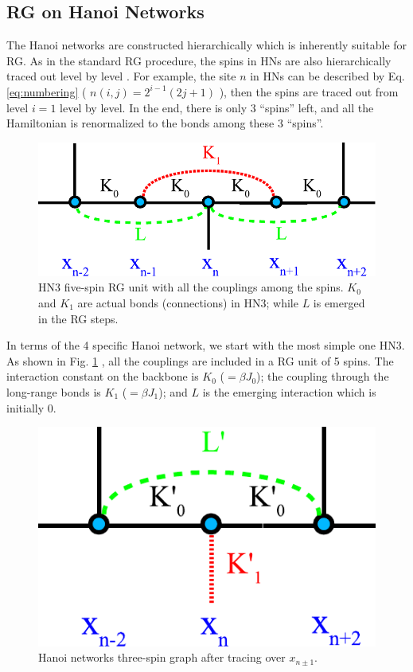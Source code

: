 \subsection{RG on Hanoi Networks}
\label{sec:afm-rghns}
The Hanoi networks are constructed hierarchically which is inherently suitable for RG. As in the standard RG procedure, the spins in HNs are also hierarchically traced out level by level \cite{Boettcher2011HNNP, brunson2014rg}. For example, the site $n$ in HNs can be described by Eq. \ref{eq:numbering} ( $n(i,j)=2^{i-1}(2j+1)$ ), then the spins are traced out from level $i=1$ level by level. In the end, there is only 3 \enquote{spins} left, and all the Hamiltonian is renormalized to the bonds among these 3  \enquote{spins}.

\begin{figure}
\centering \includegraphics[scale=0.68]{Chapter-3/RG3hanoi}
\protect\caption{HN3 five-spin RG unit with all the couplings among the spins. $K_0$ and $K_1$ are actual bonds (connections) in HN3; while $L$ is emerged in the RG steps.}
\label{fig:afm-hn3rgbefore} 
\end{figure}

In terms of the 4 specific Hanoi network, we start with the most simple one HN3. As shown in Fig. \ref{fig:afm-hn3rgbefore} \cite{Boettcher2011HNNP}, all the couplings are included in a RG unit of 5 spins. The interaction constant on the backbone is $K_0$ ($=\beta J_0$); the coupling through the long-range bonds is $K_1$ ($=\beta J_1$); and $L$ is the emerging interaction which is initially 0.

\begin{figure}
\centering \includegraphics[scale=0.68]{Chapter-3/RG3hanoi_after}
\protect\caption{Hanoi networks three-spin graph after tracing over $x_{n\pm 1}$.}
\label{fig:afm-hn3rgafter} 
\end{figure}

